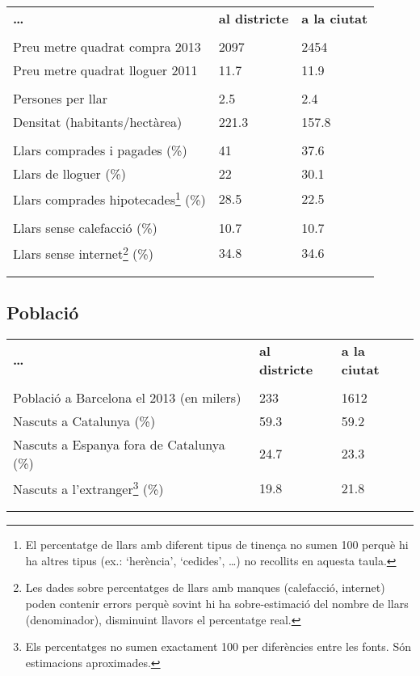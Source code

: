 \documentclass[]{article}
\begin{document}
\begin{longtable}[c]{@{}lll@{}}
\toprule\addlinespace
\textbf{\ldots{}} & \textbf{al districte} & \textbf{a la ciutat}
\\\addlinespace
\midrule\endhead
\\\addlinespace
Preu metre quadrat compra 2013 & 2097 & 2454
\\\addlinespace
Preu metre quadrat lloguer 2011 & 11.7 & 11.9
\\\addlinespace
\\\addlinespace
Persones per llar & 2.5 & 2.4
\\\addlinespace
Densitat (habitants/hectàrea) & 221.3 & 157.8
\\\addlinespace
\\\addlinespace
Llars comprades i pagades (\%) & 41 & 37.6
\\\addlinespace
Llars de lloguer (\%) & 22 & 30.1
\\\addlinespace
Llars comprades hipotecades\footnote{El percentatge de llars amb
  diferent tipus de tinença no sumen 100 perquè hi ha altres tipus (ex.:
  `herència', `cedides', \ldots{}) no recollits en aquesta taula.} (\%)
& 28.5 & 22.5
\\\addlinespace
\\\addlinespace
Llars sense calefacció (\%) & 10.7 & 10.7
\\\addlinespace
Llars sense internet\footnote{Les dades sobre percentatges de llars amb
  manques (calefacció, internet) poden contenir errors perquè sovint hi
  ha sobre-estimació del nombre de llars (denominador), disminuint
  llavors el percentatge real.} (\%) & 34.8 & 34.6
\\\addlinespace
\\\addlinespace
\bottomrule
\end{longtable}

\subsection{Població}\label{poblacio}

\begin{longtable}[c]{@{}lll@{}}
\toprule\addlinespace
\textbf{\ldots{}} & \textbf{al districte} & \textbf{a la ciutat}
\\\addlinespace
\midrule\endhead
\\\addlinespace
Població a Barcelona el 2013 (en milers) & 233 & 1612
\\\addlinespace
Nascuts a Catalunya (\%) & 59.3 & 59.2
\\\addlinespace
Nascuts a Espanya fora de Catalunya (\%) & 24.7 & 23.3
\\\addlinespace
Nascuts a l'extranger\footnote{Els percentatges no sumen exactament 100
  per diferències entre les fonts. Són estimacions aproximades.} (\%) &
19.8 & 21.8
\\\addlinespace
\\\addlinespace
\bottomrule
\end{longtable}
\end{document}
